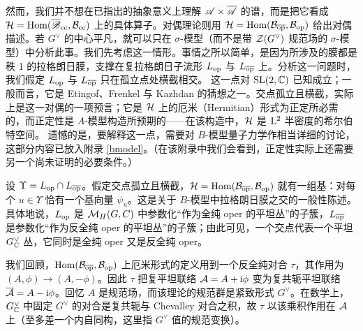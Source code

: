 然而，我们并不想在已指出的抽象意义上理解 ${\mathscr A}\times \overline{\mathscr A}$ 的谱，而是把它看成 ${\mathcal H}={\mathrm{Hom}}({\overline {\mathscr B}}_{\mathrm{cc}},{\mathcal B}_{\mathrm{cc}})$ 上的具体算子。对偶理论则用 ${\mathcal H}={\mathrm{Hom}}({\mathcal B}_{\overline{\mathrm{op}}},{\mathcal B}_{\mathrm{op}})$ 给出对偶描述。若 $G^\vee$ 的中心平凡，就可以只在 $\sigma$-模型（而不是带 ${\mathcal Z}(G^\vee)$ 规范场的 $\sigma$-模型）中分析此事。我们先考虑这一情形。事情之所以简单，是因为所涉及的膜都是秩 1 的拉格朗日膜，支撑在复拉格朗日子流形 $L_{\mathrm{op}}$ 与 $L_{\overline{\mathrm{op}}}$ 上。分析这一问题时，我们假定 $L_{\mathrm{op}}$ 与 $L_{\overline{\mathrm{op}}}$ 只在孤立点处横截相交。 这一点对 ${\mathrm{SL}}(2,{\mathbb C})$ 已知成立；一般而言，它是 Etingof、Frenkel 与 Kazhdan 的猜想之一\cite{EFK,EFK2}。交点孤立且横截，实际上是这一对偶的一项预言；它是 ${\mathcal H}$ 上的厄米（Hermitian）形式为正定所必需的，而正定性是 $A$-模型构造所预期的——在该构造中，${\mathcal H}$ 是 ${\mathrm L}^2$ 半密度的希尔伯特空间。 遗憾的是，要解释这一点，需要对 $B$-模型量子力学作相当详细的讨论，这部分内容已放入附录 \ref{bmodel}。（在该附录中我们会看到，正定性实际上还需要另一个尚未证明的必要条件。）

设 $\Upsilon=L_{\mathrm{op}}\cap L_{\overline{\mathrm{op}}}$。假定交点孤立且横截，${\mathcal H}={\mathrm{Hom}}({\mathcal B}_{\overline{\mathrm{op}}},{\mathcal B}_{\mathrm{op}})$ 就有一组基：对每个 $u\in \Upsilon$ 恰有一个基向量 $\psi_u$。这是关于 $B$-模型中拉格朗日膜之交的一般性陈述。具体地说，$L_{\mathrm{op}}$ 是 ${\mathcal M}_H(G,C)$ 中参数化“作为全纯 oper 的平坦丛”的子簇，$L_{\overline{\mathrm{op}}}$ 是参数化“作为反全纯 oper 的平坦丛”的子簇；由此可见，一个交点代表一个平坦 $G_{\mathbb C}^\vee$ 丛，它同时是全纯 oper 又是反全纯 oper。

我们回顾，${\mathrm{Hom}}({\mathcal B}_{\overline{\mathrm{op}}},{\mathcal B}_{\mathrm{op}})$ 上厄米形式的定义用到一个反全纯对合 $\tau$，其作用为 $(A,\phi)\to (A,-\phi)$。因此 $\tau$ 把复平坦联络 ${\mathcal A}=A+{\mathrm i}\phi$ 变为复共轭平坦联络 $\overline{{\mathcal A}}=A-{\mathrm i}\phi$。回忆 $A$ 是规范场，而该理论的规范群是紧致形式 $G^\vee$。在数学上，$G^\vee_{\mathbb C}$ 中固定 $G^\vee$ 的对合是复共轭与 Chevalley 对合之积，故 $\tau$ 以该乘积作用在 ${\mathcal A}$ 上（至多差一个内自同构，这里指 $G^\vee$ 值的规范变换）。

